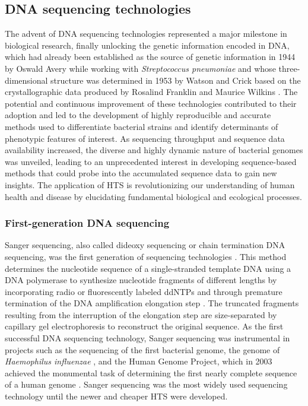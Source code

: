 \subsection{DNA sequencing technologies}

The advent of \ac{DNA} sequencing technologies represented a major milestone in biological research, finally unlocking the genetic information encoded in \ac{DNA}, which had already been established as the source of genetic information in 1944 by Oswald Avery while working with \textit{Streptococcus pneumoniae} \cite{avery_studies_1944} and whose three-dimensional structure was determined in 1953 by Watson and Crick based on the crystallographic data produced by Rosalind Franklin and Maurice Wilkins \cite{watson_molecular_1953, zallen_despite_2003}. The potential and continuous improvement of these technologies contributed to their adoption and led to the development of highly reproducible and accurate methods used to differentiate bacterial strains and identify determinants of phenotypic features of interest. As sequencing throughput and sequence data availability increased, the diverse and highly dynamic nature of bacterial genomes was unveiled, leading to an unprecedented interest in developing sequence-based methods that could probe into the accumulated sequence data to gain new insights. The application of \ac{HTS} is revolutionizing our understanding of human health and disease by elucidating fundamental biological and ecological processes.

\subsubsection{First-generation DNA sequencing}

Sanger sequencing, also called dideoxy sequencing or chain termination \ac{DNA} sequencing, was the first generation of sequencing technologies \cite{sanger_dna_1977}. This method determines the nucleotide sequence of a single-stranded template \ac{DNA} using a \ac{DNA} polymerase to synthesize nucleotide fragments of different lengths by incorporating radio or fluorescently labeled \ac{ddNTPs} and through premature termination of the \ac{DNA} amplification elongation step \cite{heather_sequence_2016, rodriguez_genesis_2023}. The truncated fragments resulting from the interruption of the elongation step are size-separated by capillary gel electrophoresis to reconstruct the original sequence. As the first successful \ac{DNA} sequencing technology, Sanger sequencing was instrumental in projects such as the sequencing of the first bacterial genome, the genome of \textit{Haemophilus influenzae} \cite{fleischmann_whole-genome_1995}, and the Human Genome Project, which in 2003 achieved the monumental task of determining the first nearly complete sequence of a human genome \cite{international_human_genome_sequencing_consortium_finishing_2004}.
Sanger sequencing was the most widely used sequencing technology until the newer and cheaper \ac{HTS} were developed.

